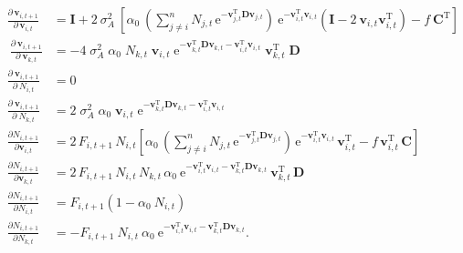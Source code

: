 \begin{equation*}
\begin{split}
    \frac{ \partial \, \mathbf{v}_{i,t+1} }{ \partial \, \mathbf{v}_{i,t} } &= 
    \mathbf{I} + 2 ~ \sigma_A^2 ~
        \left[
            \alpha_0 ~ \left(
                \sum_{j \ne i}^{n}{ N_{j,t} \, \textrm{e}^{
                - \mathbf{v}_{j,t}^{\textrm{T}}
                \mathbf{D} \mathbf{v}_{j,t} } }
            \right) ~ \textrm{e}^{ - \mathbf{v}_{i,t}^{\textrm{T}} \mathbf{v}_{i,t} }
            \left(
                \mathbf{I} - 2 ~ \mathbf{v}_{i,t} \mathbf{v}_{i,t}^{\textrm{T}}
            \right) -
            f \: \mathbf{C}^{\textrm{T}}
        \right] \\\
% 
    \frac{ \partial \: \mathbf{v}_{i,t+1} }{ \partial \: \mathbf{v}_{k,t}} &=
        -4 \; \sigma_A^2 \; \alpha_0 \; N_{k,t} \; \mathbf{v}_{i,t} \;
        \textrm{e}^{
                    - \mathbf{v}_{k,t}^{\textrm{T}} \mathbf{D} \mathbf{v}_{k,t}
                    - \mathbf{v}_{i,t}^{\textrm{T}} \mathbf{v}_{i,t}
                } \;
        \mathbf{v}_{k,t}^{\textrm{T}} \; \mathbf{D} \\
% 
    \frac{ \partial \: \mathbf{v}_{i,t+1} }{ \partial \: N_{i,t} } &= 0 \\
    \frac{ \partial \: \mathbf{v}_{i,t+1} }{ \partial \: N_{k,t} } &=
        2 \; \sigma_A^2 \; \alpha_0 \; \mathbf{v}_{i,t} \;
        \textrm{e}^{ - \mathbf{v}_{k,t}^{\textrm{T}} \mathbf{D} \mathbf{v}_{k,t}
            - \mathbf{v}_{i,t}^{\textrm{T}} \mathbf{v}_{i,t} } \\
% 
    \frac{ \partial N_{i,t+1} }{ \partial \mathbf{v}_{i,t} } &= 
        2 \, F_{i,t+1} \,  N_{i,t}
        \left[
            \alpha_0 \, \left(
                \sum_{j \ne i}^{n}{ N_{j,t} \, \textrm{e}^{
                - \mathbf{v}_{j,t}^{\textrm{T}}
                \mathbf{D} \mathbf{v}_{j,t} } }
            \right) \, \text{e}^{ -\mathbf{v}_{i,t}^{\text{T}}
            \mathbf{v}_{i,t} } \, \mathbf{v}_{i,t}^{\text{T}}
            - f \, \mathbf{v}_{i,t}^{\text{T}} \, \mathbf{C}
        \right] \\
    \frac{ \partial N_{i,t+1} }{ \partial \mathbf{v}_{k,t} } &= 
        2 \, F_{i,t+1} \, N_{i,t} \, N_{k,t} \, \alpha_0 \: 
        \text{e}^{ -\mathbf{v}_{i,t}^{\text{T}} \mathbf{v}_{i,t} -
            \mathbf{v}_{k,t}^{\text{T}} \mathbf{D} \mathbf{v}_{k,t} } \:
        \mathbf{v}_{k,t}^{\text{T}} \, \mathbf{D} \\
% 
    \frac{ \partial N_{i,t+1} }{ \partial N_{i,t} } &= 
        F_{i,t+1} \left( 1 - \alpha_0 \: N_{i,t} \right) \\
    \frac{ \partial N_{i,t+1} }{ \partial N_{k,t} } &= 
        - F_{i,t+1} \: N_{i,t} \: \alpha_0 \: 
        \text{e}^{ -\mathbf{v}_{i,t}^{\text{T}} \mathbf{v}_{i,t} -
            \mathbf{v}_{k,t}^{\text{T}} \mathbf{D} \mathbf{v}_{k,t} } 
    \textrm{.}
\end{split}
\end{equation*}



